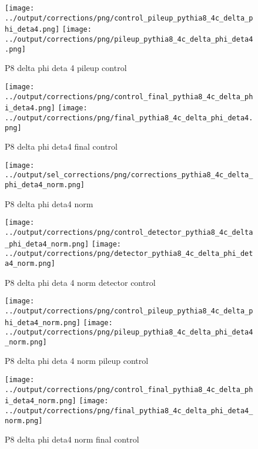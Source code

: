 \documentclass[11pt]{book}
\begin{document}
\begin{figure}[ht]
\centering
\texttt{[image: ../output/corrections/png/control\_pileup\_pythia8\_4c\_delta\_phi\_deta4.png]}
\texttt{[image: ../output/corrections/png/pileup\_pythia8\_4c\_delta\_phi\_deta4.png]}
\caption{P8 delta phi deta 4 pileup control}
\label{fig:p8_delta_phi_deta4_pileup_control}
\end{figure}


\begin{figure}[ht]
\centering
\texttt{[image: ../output/corrections/png/control\_final\_pythia8\_4c\_delta\_phi\_deta4.png]}
\texttt{[image: ../output/corrections/png/final\_pythia8\_4c\_delta\_phi\_deta4.png]}
\caption{P8 delta phi deta4 final control}
\label{fig:p8_delta_phi_deta4_final_control}
\end{figure}


\begin{figure}[ht]
\centering
\texttt{[image: ../output/sel\_corrections/png/corrections\_pythia8\_4c\_delta\_phi\_deta4\_norm.png]}
\caption{P8 delta phi deta4 norm}
\label{fig:p8_delta_phi_deta4_norm}
\end{figure}

\begin{figure}[ht]
\centering
\texttt{[image: ../output/corrections/png/control\_detector\_pythia8\_4c\_delta\_phi\_deta4\_norm.png]}
\texttt{[image: ../output/corrections/png/detector\_pythia8\_4c\_delta\_phi\_deta4\_norm.png]}
\caption{P8 delta phi deta 4 norm detector control}
\label{fig:p8_delta_phi_deta4_norm_detector_control}
\end{figure}

\begin{figure}[ht]
\centering
\texttt{[image: ../output/corrections/png/control\_pileup\_pythia8\_4c\_delta\_phi\_deta4\_norm.png]}
\texttt{[image: ../output/corrections/png/pileup\_pythia8\_4c\_delta\_phi\_deta4\_norm.png]}
\caption{P8 delta phi deta 4 norm pileup control}
\label{fig:p8_delta_phi_deta4_norm_pileup_control}
\end{figure}


\begin{figure}[ht]
\centering
\texttt{[image: ../output/corrections/png/control\_final\_pythia8\_4c\_delta\_phi\_deta4\_norm.png]}
\texttt{[image: ../output/corrections/png/final\_pythia8\_4c\_delta\_phi\_deta4\_norm.png]}
\caption{P8 delta phi deta4 norm final control}
\label{fig:p8_delta_phi_deta4_norm_final_control}
\end{figure}
\end{document}
